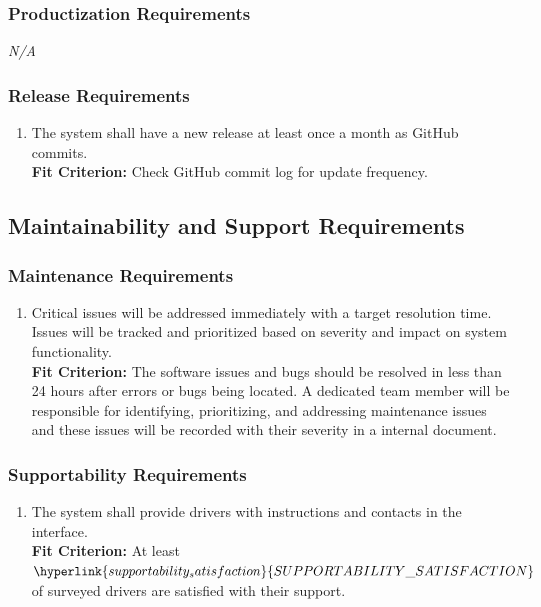\documentclass[12pt,letterpaper]{article}
\begin{document}
\subsubsection{Productization Requirements}
\noindent \emph{N/A}

\subsubsection{Release Requirements}
\begin{enumerate}[resume*] 
    \item The system shall have a new release at least once a month as GitHub
    commits.\\
    \textbf{Fit Criterion:} Check GitHub commit log for update frequency.
\end{enumerate}

\subsection{Maintainability and Support Requirements}
\subsubsection{Maintenance Requirements}
\color{red}
\begin{enumerate}[{MA}1.] 
    \item Critical issues will be addressed immediately with a target resolution
    time. Issues will be tracked and prioritized based on severity and impact on
    system functionality. \\
    \textbf{Fit Criterion:} The software issues and bugs should be resolved in
    less than 24 hours after errors or bugs being located. A dedicated team
    member will be responsible for identifying, prioritizing, and addressing
    maintenance issues and these issues will be recorded with their severity in
    a internal document.
\end{enumerate}
\color{black}

\subsubsection{Supportability Requirements}
\begin{enumerate}[resume*] 
    \item The system shall provide drivers with instructions and contacts in the
    interface.\\
    \textbf{Fit Criterion:} At least
    $\hyperlink{supportability_satisfaction}{SUPPORTABILITY\_SATISFACTION}$ of
    surveyed drivers are satisfied with their support.
\end{enumerate}
\end{document}
